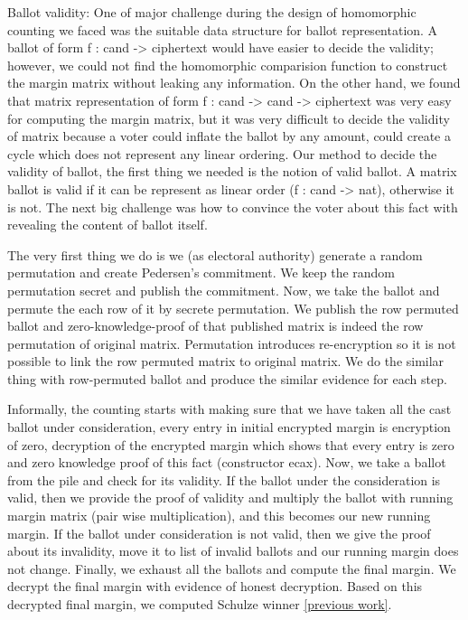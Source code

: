 Ballot validity: 
One of major challenge during the design of homomorphic counting we faced was the suitable data structure for
ballot representation. A ballot of form f : cand -> ciphertext would have easier to decide the validity; however, 
we could not find the homomorphic comparision function to construct the margin matrix without leaking 
any information. On the other hand, we found that matrix representation of form f : cand -> cand -> ciphertext 
was very easy for computing the margin matrix, but it was very difficult to decide the validity of matrix because 
a voter could inflate the ballot by any amount, could create a cycle which does not represent any linear 
ordering. Our method to decide the validity of ballot, the first thing we needed is the notion of valid ballot. 
A matrix ballot is valid if it can be represent as linear order (f : cand -> nat), otherwise it is not. The next 
big challenge was how to convince the voter about this fact with revealing the content of ballot itself. 

The very first thing we do is we (as electoral authority) generate a random permutation and create Pedersen's commitment. 
We keep the random permutation secret and publish the commitment. Now, we take the ballot and permute the each row of 
it by secrete permutation. We publish the row permuted ballot and zero-knowledge-proof of that  
published matrix is indeed the row permutation of original matrix. 
Permutation introduces re-encryption so it is not possible to link the row permuted matrix to 
original matrix. We do the similar thing with row-permuted ballot and produce the similar evidence for 
each step.  



Informally, the counting starts with making sure that we have taken all the cast ballot under consideration, every entry 
in initial encrypted margin is encryption of zero, decryption of the encrypted margin which shows that every entry is zero and 
zero knowledge proof of this fact (constructor ecax).  Now, we take a ballot from the pile and check for its validity.  
If the ballot under the consideration is valid, then we provide the proof of validity and multiply the ballot with 
running margin matrix (pair wise multiplication), and this becomes our new running margin. If the ballot under consideration is 
not valid, then we 
give the proof about its invalidity, move it to list of invalid ballots and our running margin does not change. 
Finally, we exhaust all the ballots and compute the final margin. We decrypt the final margin with evidence of 
honest decryption. Based on this decrypted final margin, we computed Schulze winner \ref{previous work}. 

